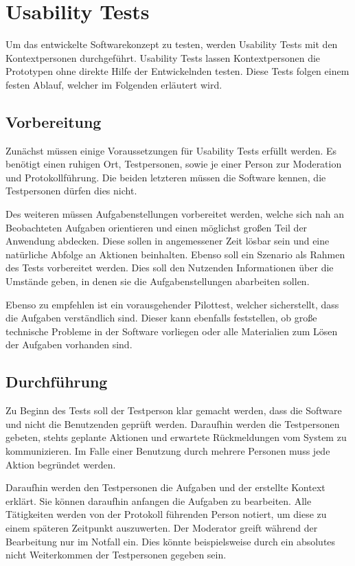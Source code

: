 \section{Usability Tests}

Um das entwickelte Softwarekonzept zu testen, werden Usability Tests mit den Kontextpersonen durchgeführt.
Usability Tests lassen Kontextpersonen die Prototypen ohne direkte Hilfe der Entwickelnden testen.
Diese Tests folgen einem festen Ablauf, welcher im Folgenden erläutert wird.

\subsection{Vorbereitung}

Zunächst müssen einige Voraussetzungen für Usability Tests erfüllt werden.
Es benötigt einen ruhigen Ort, Testpersonen, sowie je einer Person zur Moderation und Protokollführung.
Die beiden letzteren müssen die Software kennen, die Testpersonen dürfen dies nicht.

Des weiteren müssen Aufgabenstellungen vorbereitet werden, welche sich nah an Beobachteten Aufgaben orientieren und einen möglichst großen Teil der Anwendung abdecken.
Diese sollen in angemessener Zeit lösbar sein und eine natürliche Abfolge an Aktionen beinhalten.
Ebenso soll ein Szenario als Rahmen des Tests vorbereitet werden.
Dies soll den Nutzenden Informationen über die Umstände geben, in denen sie die Aufgabenstellungen abarbeiten sollen.

Ebenso zu empfehlen ist ein vorausgehender Pilottest, welcher sicherstellt, dass die Aufgaben verständlich sind.
Dieser kann ebenfalls feststellen, ob große technische Probleme in der Software vorliegen oder alle Materialien zum Lösen der Aufgaben vorhanden sind.

\subsection{Durchführung}

Zu Beginn des Tests soll der Testperson klar gemacht werden, dass die Software und nicht die Benutzenden geprüft werden.
Daraufhin werden die Testpersonen gebeten, stehts geplante Aktionen und erwartete Rückmeldungen vom System zu kommunizieren.
Im Falle einer Benutzung durch mehrere Personen muss jede Aktion begründet werden.

Daraufhin werden den Testpersonen die Aufgaben und der erstellte Kontext erklärt.
Sie können daraufhin anfangen die Aufgaben zu bearbeiten.
Alle Tätigkeiten werden von der Protokoll führenden Person notiert, um diese zu einem späteren Zeitpunkt auszuwerten.
Der Moderator greift während der Bearbeitung nur im Notfall ein.
Dies könnte beispielsweise durch ein absolutes nicht Weiterkommen der Testpersonen gegeben sein.

